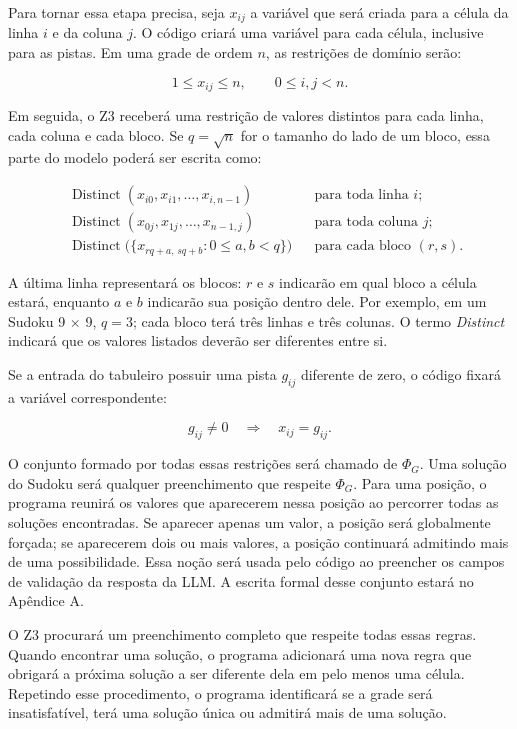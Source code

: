 Para tornar essa etapa precisa, seja $x_{ij}$ a variável que será criada para a célula da linha $i$ e da coluna $j$. O código criará uma variável para cada célula, inclusive para as pistas. Em uma grade de ordem $n$, as restrições de domínio serão:

\[
1 \leq x_{ij} \leq n,
\qquad 0 \leq i,j < n.
\]

Em seguida, o Z3 receberá uma restrição de valores distintos para cada linha, cada coluna e cada bloco. Se $q=\sqrt{n}$ for o tamanho do lado de um bloco, essa parte do modelo poderá ser escrita como:

\[
\begin{aligned}
&\operatorname{Distinct}(x_{i0},x_{i1},\ldots,x_{i,n-1}) && \text{para toda linha } i;\\
&\operatorname{Distinct}(x_{0j},x_{1j},\ldots,x_{n-1,j}) && \text{para toda coluna } j;\\
&\operatorname{Distinct}\bigl(\{x_{rq+a,\,sq+b}:0\leq a,b<q\}\bigr) && \text{para cada bloco } (r,s).
\end{aligned}
\]

A última linha representará os blocos: $r$ e $s$ indicarão em qual bloco a célula estará, enquanto $a$ e $b$ indicarão sua posição dentro dele. Por exemplo, em um Sudoku 9 $\times$ 9, $q=3$; cada bloco terá três linhas e três colunas. O termo \textit{Distinct} indicará que os valores listados deverão ser diferentes entre si.

Se a entrada do tabuleiro possuir uma pista $g_{ij}$ diferente de zero, o código fixará a variável correspondente:

\[
g_{ij}\neq 0 \quad \Longrightarrow \quad x_{ij}=g_{ij}.
\]

O conjunto formado por todas essas restrições será chamado de $\Phi_G$. Uma solução do Sudoku será qualquer preenchimento que respeite $\Phi_G$. Para uma posição, o programa reunirá os valores que aparecerem nessa posição ao percorrer todas as soluções encontradas. Se aparecer apenas um valor, a posição será globalmente forçada; se aparecerem dois ou mais valores, a posição continuará admitindo mais de uma possibilidade. Essa noção será usada pelo código ao preencher os campos de validação da resposta da LLM. A escrita formal desse conjunto estará no Apêndice A.

O Z3 procurará um preenchimento completo que respeite todas essas regras. Quando encontrar uma solução, o programa adicionará uma nova regra que obrigará a próxima solução a ser diferente dela em pelo menos uma célula. Repetindo esse procedimento, o programa identificará se a grade será insatisfatível, terá uma solução única ou admitirá mais de uma solução.

